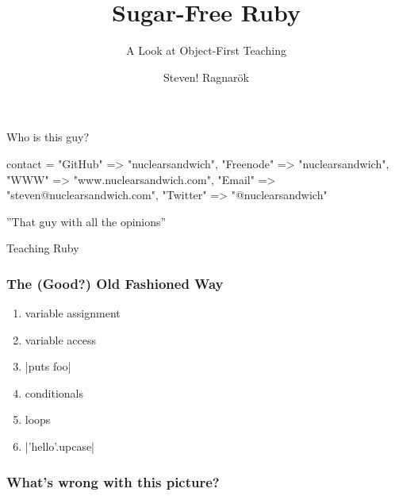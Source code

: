 \documentclass[20pt,draft]{beamer}
\author{Steven! Ragnarök}
\title{Sugar-Free Ruby}
\subtitle{A Look at Object-First Teaching}
\begin{document}
\begin{frame}
	\titlepage
\end{frame}

\begin{frame}[fragile]
	\begin{center}
		{Who is this guy?}
		\vspace{1cm}

		\insertauthor
	\end{center}
	\begin{ruby10pt}
contact = {
  "GitHub"   =>        "nuclearsandwich",
  "Freenode" =>        "nuclearsandwich",
  "WWW"      =>    "www.nuclearsandwich.com",
  "Email"    => "steven@nuclearsandwich.com",
  "Twitter"  =>       "@nuclearsandwich"
}
	\end{ruby10pt}

	\begin{center}
		''That guy with all the opinions''
	\end{center}
\end{frame}

\begin{frame}
	\par { Teaching Ruby}
\end{frame}

\begin{center}

\end{center}


\begin{frame}
	\frametitle{The (Good?) Old Fashioned Way}
	\begin{enumerate}
		\item variable assignment
		\item variable access
		\item \ruby|puts foo|
		\item conditionals
		\item loops
		\item \ruby|'hello'.upcase|
	\end{enumerate}
\end{frame}

\begin{frame}
	\frametitle{What's wrong with this picture?}

\end{frame}
\end{document}
